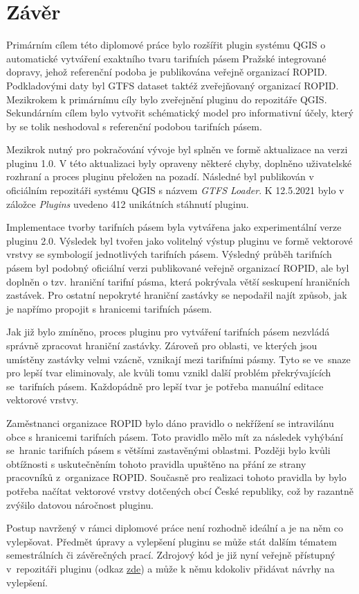 \chapter*{Závěr}
\label{6-zaver}

Primárním cílem této diplomové práce bylo rozšířit plugin systému QGIS 
o automa\-tické vytváření exaktního tvaru tarifních pásem Pražské integrované dopravy, 
jehož referenční podoba je publikována veřejně organizací ROPID.  
Podkladovými daty byl GTFS dataset taktéž zveřejňovaný organizací ROPID.
Mezikrokem k primárnímu cíly bylo zveřejnění pluginu do repozitáře QGIS. Sekundárním cílem bylo vytvořit schématický model pro 
informativní účely, který by se tolik neshodoval s referenční podobou tarifních pásem.

Mezikrok nutný pro pokračování vývoje byl splněn ve formě aktualizace na verzi pluginu 1.0.
V této aktualizaci byly opraveny některé chyby, doplněno uživatelské rozhraní a proces pluginu přeložen na pozadí. 
Následné byl publikován v oficiálním repozitáři systému QGIS s názvem \textit{GTFS Loader}. 
K 12.5.2021 bylo v záložce \textit{Plugins} uvedeno 412 unikátních stáhnutí pluginu.

Implementace tvorby tarifních pásem byla vytvářena jako experimentální verze pluginu 2.0. Výsledek
byl tvořen jako volitelný výstup pluginu ve formě vektorové vrstvy se symbologií jednotlivých tarifních pásem.
Výsledný průběh tarifních pásem byl podobný oficiální verzi publikované veřejně organizací ROPID, ale byl doplněn o tzv. hraniční tarifní pásma,
která pokrývala větší seskupení hraničních zastávek. Pro ostatní nepokryté hraniční zastávky 
se nepodařil najít způsob, jak je napřímo propojit s hranicemi tarifních pásem.

Jak již bylo zmíněno, proces pluginu pro vytváření tarifních pásem nezvládá správně zpracovat hraniční zastávky.
Zároveň pro oblasti, ve kterých jsou umístěny zastávky velmi vzácně, vznikají  mezi tarifními pásmy.
Tyto  se ve~snaze pro lepší tvar eliminovaly, ale kvůli tomu vznikl další problém překrývajících se~ta\-rifních pásem.
Každopádně pro lepší tvar je potřeba manuální editace vektorové vrstvy.

Zaměstnanci organizace ROPID bylo dáno pravidlo o nekřížení se intravilánu obce s hranicemi tarifních pásem.
Toto pravidlo mělo mít za následek vyhýbání se~hranic tarifních pásem s většími zastavěnými oblastmi.
Později bylo kvůli obtíž\-nosti s uskutečněním tohoto pravidla upuštěno na přání ze strany pracovníků z~organizace ROPID.
Současně pro realizaci tohoto pravidla by bylo potřeba načítat vektorové vrstvy
dotčených obcí České republiky, což by razantně zvýšilo datovou náročnost pluginu.

Postup navržený v rámci diplomové práce není rozhodně ideální a je na něm co vylepšovat. Předmět úpravy a vylepšení pluginu
se může stát dalším tématem semestrálních či závěrečných prací. Zdrojový kód
je již nyní veřejně přístupný v~repozitáři pluginu (odkaz \href{https://github.com/ctu-geoforall-lab/qgis-gtfs-plugin/tree/pid\_zones}
{\underline{zde}}) a může k němu kdokoliv přidávat
návrhy na vylepšení.  

